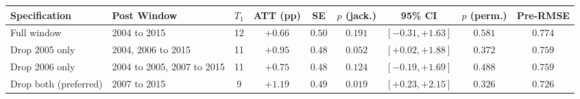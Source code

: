 \begin{tabular}{llccccccc}
\hline\hline
Specification & Post Window & $T_1$ & ATT (pp) & SE & $p$ (jack.) & 95\% CI & $p$ (perm.) & Pre-RMSE \\
\hline
Full window & 2004 to 2015 & 12 & $+0.66$ & $0.50$ & $0.191$ & $[-0.31, +1.63]$ & $0.581$ & $0.774$ \\
Drop 2005 only & 2004, 2006 to 2015 & 11 & $+0.95$ & $0.48$ & $0.052$ & $[+0.02, +1.88]$ & $0.372$ & $0.759$ \\
Drop 2006 only & 2004 to 2005, 2007 to 2015 & 11 & $+0.75$ & $0.48$ & $0.124$ & $[-0.19, +1.69]$ & $0.488$ & $0.759$ \\
Drop both (preferred) & 2007 to 2015 & 9 & $+1.19$ & $0.49$ & $0.019$ & $[+0.23, +2.15]$ & $0.326$ & $0.726$ \\
\hline\hline
\end{tabular}
